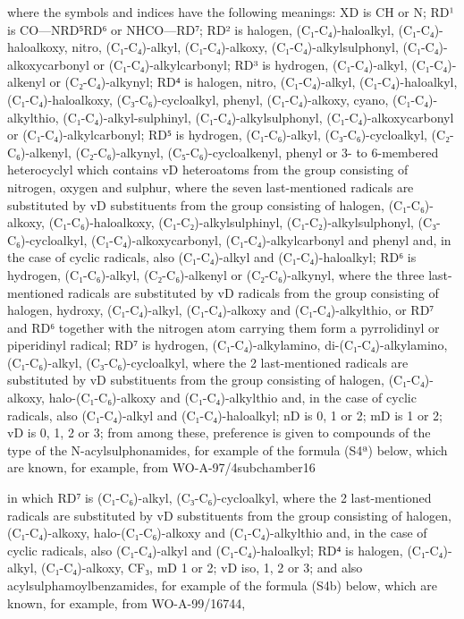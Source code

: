 \documentclass[11pt,a4paper]{article}
\begin{document}
where the symbols and indices have the following meanings: XD is CH or N; RD¹ is CO—NRD⁵RD⁶ or NHCO—RD⁷; RD² is halogen, (C₁-C₄)-haloalkyl, (C₁-C₄)-haloalkoxy, nitro, (C₁-C₄)-alkyl, (C₁-C₄)-alkoxy, (C₁-C₄)-alkylsulphonyl, (C₁-C₄)-alkoxycarbonyl or (C₁-C₄)-alkylcarbonyl; RD³ is hydrogen, (C₁-C₄)-alkyl, (C₁-C₄)-alkenyl or (C₂-C₄)-alkynyl; RD⁴ is halogen, nitro, (C₁-C₄)-alkyl, (C₁-C₄)-haloalkyl, (C₁-C₄)-haloalkoxy, (C₃-C₆)-cycloalkyl, phenyl, (C₁-C₄)-alkoxy, cyano, (C₁-C₄)-alkylthio, (C₁-C₄)-alkyl-sulphinyl, (C₁-C₄)-alkylsulphonyl, (C₁-C₄)-alkoxycarbonyl or (C₁-C₄)-alkylcarbonyl; RD⁵ is hydrogen, (C₁-C₆)-alkyl, (C₃-C₆)-cycloalkyl, (C₂-C₆)-alkenyl, (C₂-C₆)-alkynyl, (C₅-C₆)-cycloalkenyl, phenyl or 3- to 6-membered heterocyclyl which contains vD heteroatoms from the group consisting of nitrogen, oxygen and sulphur, where the seven last-mentioned radicals are substituted by vD substituents from the group consisting of halogen, (C₁-C₆)-alkoxy, (C₁-C₆)-haloalkoxy, (C₁-C₂)-alkylsulphinyl, (C₁-C₂)-alkylsulphonyl, (C₃-C₆)-cycloalkyl, (C₁-C₄)-alkoxycarbonyl, (C₁-C₄)-alkylcarbonyl and phenyl and, in the case of cyclic radicals, also (C₁-C₄)-alkyl and (C₁-C₄)-haloalkyl; RD⁶ is hydrogen, (C₁-C₆)-alkyl, (C₂-C₆)-alkenyl or (C₂-C₆)-alkynyl, where the three last-mentioned radicals are substituted by vD radicals from the group consisting of halogen, hydroxy, (C₁-C₄)-alkyl, (C₁-C₄)-alkoxy and (C₁-C₄)-alkylthio, or RD⁷ and RD⁶ together with the nitrogen atom carrying them form a pyrrolidinyl or piperidinyl radical; RD⁷ is hydrogen, (C₁-C₄)-alkylamino, di-(C₁-C₄)-alkylamino, (C₁-C₆)-alkyl, (C₃-C₆)-cycloalkyl, where the 2 last-mentioned radicals are substituted by vD substituents from the group consisting of halogen, (C₁-C₄)-alkoxy, halo-(C₁-C₆)-alkoxy and (C₁-C₄)-alkylthio and, in the case of cyclic radicals, also (C₁-C₄)-alkyl and (C₁-C₄)-haloalkyl; nD is 0, 1 or 2; mD is 1 or 2; vD is 0, 1, 2 or 3; from among these, preference is given to compounds of the type of the N-acylsulphonamides, for example of the formula (S4ª) below, which are known, for example, from WO-A-97/4subchamber16

in which RD⁷ is (C₁-C₆)-alkyl, (C₃-C₆)-cycloalkyl, where the 2 last-mentioned radicals are substituted by vD substituents from the group consisting of halogen, (C₁-C₄)-alkoxy, halo-(C₁-C₆)-alkoxy and (C₁-C₄)-alkylthio and, in the case of cyclic radicals, also (C₁-C₄)-alkyl and (C₁-C₄)-haloalkyl; RD⁴ is halogen, (C₁-C₄)-alkyl, (C₁-C₄)-alkoxy, CF₃, mD 1 or 2; vD iso, 1, 2 or 3; and also acylsulphamoylbenzamides, for example of the formula (S4b) below, which are known, for example, from WO-A-99/16744,
\end{document}
